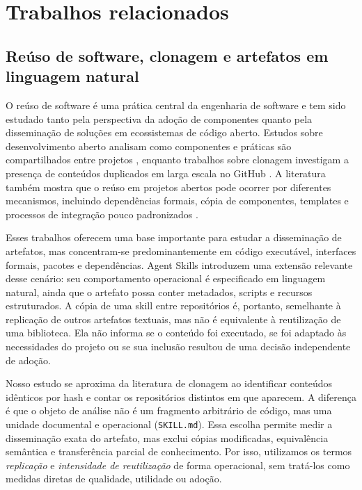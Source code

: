 \section{Trabalhos relacionados}\label{trabalhos-relacionados}

\subsection{Reúso de software, clonagem e artefatos em linguagem
natural}\label{reuxfaso-de-software-clonagem-e-artefatos-em-linguagem-natural}

O reúso de software é uma prática central da engenharia de software e
tem sido estudado tanto pela perspectiva da adoção de componentes quanto
pela disseminação de soluções em ecossistemas de código aberto. Estudos
sobre desenvolvimento aberto analisam como componentes e práticas são
compartilhados entre projetos \cite{mockus2002two,haefliger2008code},
enquanto trabalhos sobre clonagem investigam a presença de conteúdos
duplicados em larga escala no GitHub \cite{lopes2017dejavu}. A
literatura também mostra que o reúso em projetos abertos pode ocorrer
por diferentes mecanismos, incluindo dependências formais, cópia de
componentes, templates e processos de integração pouco padronizados
\cite{heinemann2011extents}.

Esses trabalhos oferecem uma base importante para estudar a disseminação
de artefatos, mas concentram-se predominantemente em código executável,
interfaces formais, pacotes e dependências. Agent Skills introduzem uma
extensão relevante desse cenário: seu comportamento operacional é
especificado em linguagem natural, ainda que o artefato possa conter
metadados, scripts e recursos estruturados. A cópia de uma skill entre
repositórios é, portanto, semelhante à replicação de outros artefatos
textuais, mas não é equivalente à reutilização de uma biblioteca. Ela
não informa se o conteúdo foi executado, se foi adaptado às necessidades
do projeto ou se sua inclusão resultou de uma decisão independente de
adoção.

Nosso estudo se aproxima da literatura de clonagem ao identificar
conteúdos idênticos por hash e contar os repositórios distintos em que
aparecem. A diferença é que o objeto de análise não é um fragmento
arbitrário de código, mas uma unidade documental e operacional
(\texttt{SKILL.md}). Essa escolha permite medir a disseminação exata do
artefato, mas exclui cópias modificadas, equivalência semântica e
transferência parcial de conhecimento. Por isso, utilizamos os termos
\emph{replicação} e \emph{intensidade de reutilização} de forma
operacional, sem tratá-los como medidas diretas de qualidade, utilidade
ou adoção.

